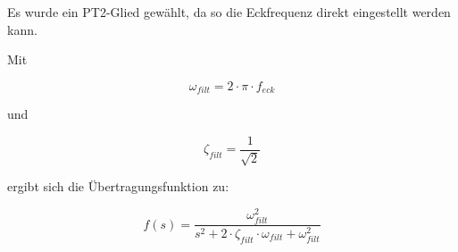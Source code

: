 Es wurde ein PT2-Glied gewählt, da so die Eckfrequenz direkt eingestellt werden 
kann. %

Mit

\begin{equation}
	\omega_{filt} = 2 \cdot \pi \cdot f_{eck}
\end{equation}

und

\begin{equation}
	\zeta_{filt} = \frac{1}{\sqrt{2}}
\end{equation}

ergibt sich die Übertragungsfunktion zu:

\begin{equation}
	f(s) = \frac{\omega_{filt}^2}{s^2+2 \cdot \zeta_{filt} \cdot \omega_{filt} +\omega_{filt}^2}
\end{equation}